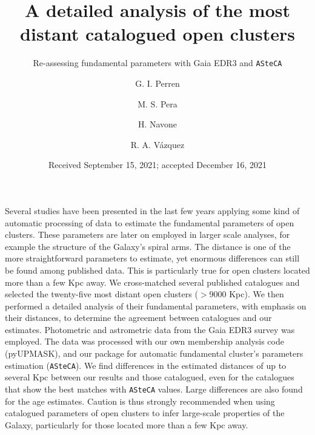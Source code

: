 \documentclass{aa}
\begin{document}
 


\title{A detailed analysis of the most distant catalogued open clusters}
\subtitle{Re-assessing fundamental parameters with Gaia EDR3 and \texttt{ASteCA}}

\author{G. I. Perren
      \and
      M. S. Pera
      \and
      H. Navone
      \and
      R. A. Vázquez
}

\date{Received September 15, 2021; accepted December 16, 2021}

 
\abstract
{Several studies have been presented in the last few years applying some kind of
automatic processing of data to estimate the fundamental parameters of open
clusters. These parameters are later on employed in larger scale analyses, for
example the structure of the Galaxy's spiral arms.
The distance is one of the more straightforward parameters to estimate, yet
enormous differences can still be found among published data. This is
particularly true for open clusters located more than a few Kpc away.}
{
We cross-matched several published catalogues and selected the twenty-five most
distant open clusters ($>$9000 Kpc). We then performed a detailed analysis of
their fundamental parameters, with emphasis on their distances, to determine the
agreement between catalogues and our estimates.}
{Photometric and astrometric data from the Gaia EDR3 survey was employed. The
data was processed with our own membership analysis code (pyUPMASK), and our
package for automatic fundamental cluster's parameters estimation
(\texttt{ASteCA}).}
{We find differences in the estimated distances of up to several Kpc
between our results and those catalogued, even for the catalogues that show the
best matches with \texttt{ASteCA} values. Large differences are also found for
the age estimates.}
{Caution is thus strongly recommended when using catalogued parameters of open
clusters to infer large-scale properties of the Galaxy, particularly for those
located more than a few Kpc away.}
\end{document}
